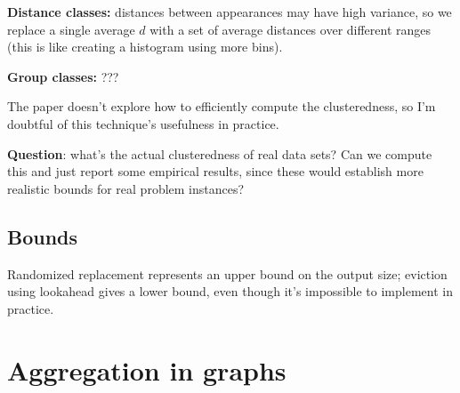 \documentclass[12pt]{article}
\begin{document}
\textbf{Distance classes:} distances between appearances may have high variance, so we replace a single average $d$ with a set of average distances over different ranges (this is like creating a histogram using more bins).

\textbf{Group classes:} ???

The paper doesn't explore how to efficiently compute the clusteredness, so I'm doubtful of this technique's usefulness in practice.

\textbf{Question}: what's the actual clusteredness of real data sets?  Can we compute this and just report some empirical results, since these would establish more realistic bounds for real problem instances?

\subsection{Bounds}

\cite{estimating-cardinality}
Randomized replacement represents an upper bound on the output size; eviction using lookahead gives a lower bound, even though it's impossible to implement in practice.

\section{Aggregation in graphs}





\end{document}
